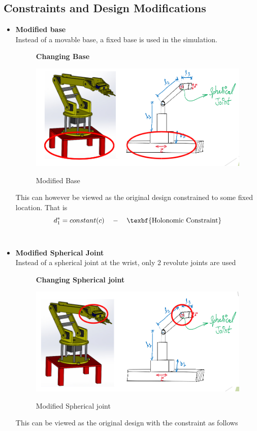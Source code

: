 \documentclass[12pt]{article}
\begin{document}
  \subsection{Constraints and Design Modifications}
  \begin{itemize}
    \item \textbf{Modified base} \\
    Instead of a movable base, a fixed base is used in the simulation.
  \begin{figure}[H]
    \centering
    \textbf{Changing Base}\par\medskip
    \includegraphics[scale = 0.67]{modifiedbase.png}\\[0.0 cm]	%
    \caption{Modified Base}
  \end{figure} 
  This can however be viewed as the original design constrained to some fixed location.
  That  is 
  \begin{equation}
    d_1^*= constant(c) \quad  -\quad \text{\texbf{Holonomic Constraint}}
  \end{equation} \\ 

  \item \textbf{Modified Spherical Joint} \\
     Instead of a spherical joint at the wrist, only 2 revolute joints are used
  \begin{figure}[H]
    \centering
    \textbf{Changing Spherical joint}\par\medskip
    \includegraphics[scale = 0.7]{modifiedjoint.png}\\[0.0 cm]	%
    \caption{Modified Spherical joint}
  \end{figure} 
  This can be viewed as the original design with the constraint as follows
  

\end{itemize}
\end{document}
